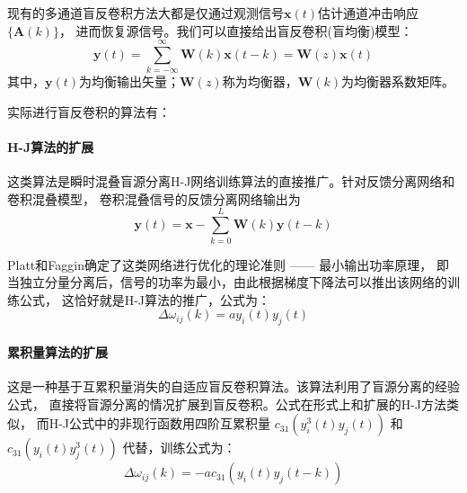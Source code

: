 现有的多通道盲反卷积方法大都是仅通过观测信号$\bm{x}(t)$估计通道冲击响应$\{\bm{A}(k)\}$，
进而恢复源信号。我们可以直接给出盲反卷积(盲均衡)模型：
\begin{equation}
\bm{y}(t) = \sum^\infty_{k=-\infty}\bm{W}(k)\bm{x}(t-k)=\bm{W}(z)\bm{x}(t)
\end{equation}
其中，$\bm{y}(t)$为均衡输出矢量；$\bm{W}(z)$称为均衡器，$\bm{W}(k)$为均衡器系数矩阵。

实际进行盲反卷积的算法有：
\paragraph*{H-J算法的扩展}
这类算法是瞬时混叠盲源分离H-J网络训练算法的直接推广。针对反馈分离网络和卷积混叠模型，
卷积混叠信号的反馈分离网络输出为
\begin{equation}
\bm{y}(t)=\bm{x}-\sum^{L}_{k=0}\bm{W}(k)\bm{y}(t-k)
\end{equation}

Platt和Faggin确定了这类网络进行优化的理论准则 —— 最小输出功率原理，
即当独立分量分离后，信号的功率为最小，由此根据梯度下降法可以推出该网络的训练公式，
这恰好就是H-J算法的推广，公式为：
\begin{equation}
\Delta\omega_{ij}(k)=a y_i(t)y_j(t)
\end{equation}

\paragraph*{累积量算法的扩展}
这是一种基于互累积量消失的自适应盲反卷积算法。该算法利用了盲源分离的经验公式，
直接将盲源分离的情况扩展到盲反卷积。公式在形式上和扩展的H-J方法类似，
而H-J公式中的非现行函数用四阶互累积量
$c_{31}(y_i^3(t)y_j(t))$ 和 $c_{31}(y_i(t)y_j^3(t))$
代替，训练公式为：
\begin{equation}
\Delta\omega_{ij}(k)=-ac_{31}(y_i(t)y_j(t-k))
\end{equation}
